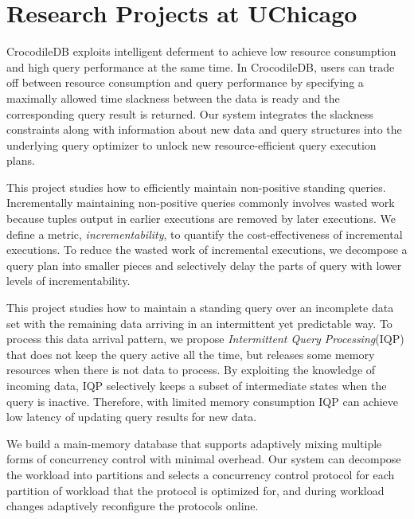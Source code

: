 \documentclass[10pt]{article} %
\begin{document}
\vspace{-5mm}

\section{Research Projects at UChicago}

{CrocodileDB exploits intelligent deferment to achieve low resource consumption 
and high query performance at the same time. 
In CrocodileDB, users can trade off between resource consumption and query performance 
by specifying a maximally allowed time slackness 
between the data is ready and the corresponding query result is returned. 
Our system integrates the slackness constraints along with information 
about new data and query structures into the underlying query optimizer 
to unlock new resource-efficient query execution plans.}

{This project studies how to efficiently maintain non-positive standing queries. 
Incrementally maintaining non-positive queries commonly involves wasted work 
because tuples output in earlier executions are removed by later executions.  
We define a metric, \textit{incrementability}, to quantify the cost-effectiveness of incremental executions. 
To reduce the wasted work of incremental executions, 
we decompose a query plan into smaller pieces and selectively delay the parts of query with lower levels of incrementability. 
}

{This project studies how to maintain a standing query 
over an incomplete data set with the remaining data
arriving in an intermittent yet predictable way. 
To process this data arrival pattern, 
we propose \textit{Intermittent Query Processing}(IQP) 
that does not keep the query active all the time, but releases some memory resources when there is not data to process. 
By exploiting the knowledge of incoming data, 
IQP selectively keeps a subset of intermediate states when the query is inactive. 
Therefore, with limited memory consumption IQP can achieve low latency of updating query results for new data.  
}

{
We build a main-memory database that supports adaptively mixing multiple forms of concurrency control with minimal overhead. 
Our system can decompose the workload into partitions and 
selects a concurrency control protocol for each partition of workload that the protocol is optimized for, 
and during workload changes adaptively reconfigure the protocols online.
}
\end{document}
